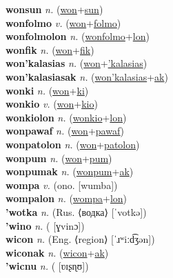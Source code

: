 \textbf{wonsun} \textit{n.} (\hyperref[won]{won}+\hyperref[sun]{sun})
 \label{wonsun} \\
\textbf{wonfolmo} \textit{v.} (\hyperref[won]{won}+\hyperref[folmo]{folmo})
 \label{wonfolmo} \\
\textbf{wonfolmolon} \textit{n.} (\hyperref[wonfolmo]{wonfolmo}+\hyperref[lon]{lon})
 \label{wonfolmolon} \\
\textbf{wonfik} \textit{n.} (\hyperref[won]{won}+\hyperref[fik]{fik})
 \label{wonfik} \\
\textbf{won'kalasias} \textit{n.} (\hyperref[won]{won}+\hyperref['kalasias]{'kalasias})
 \label{won'kalasias} \\
\textbf{won'kalasiasak} \textit{n.} (\hyperref[won'kalasias]{won'kalasias}+\hyperref[ak]{ak})
 \label{won'kalasiasak} \\
\textbf{wonki} \textit{n.} (\hyperref[won]{won}+\hyperref[ki]{ki})
 \label{wonki} \\
\textbf{wonkio} \textit{v.} (\hyperref[won]{won}+\hyperref[kio]{kio})
 \label{wonkio} \\
\textbf{wonkiolon} \textit{n.} (\hyperref[wonkio]{wonkio}+\hyperref[lon]{lon})
 \label{wonkiolon} \\
\textbf{wonpawaf} \textit{n.} (\hyperref[won]{won}+\hyperref[pawaf]{pawaf})
 \label{wonpawaf} \\
\textbf{wonpatolon} \textit{n.} (\hyperref[won]{won}+\hyperref[patolon]{patolon})
 \label{wonpatolon} \\
\textbf{wonpum} \textit{n.} (\hyperref[won]{won}+\hyperref[pum]{pum})
 \label{wonpum} \\
\textbf{wonpumak} \textit{n.} (\hyperref[wonpum]{wonpum}+\hyperref[ak]{ak})
 \label{wonpumak} \\
\textbf{wompa} \textit{v.} (ono. [wumba])
 \label{wompa} \\
\textbf{wompalon} \textit{n.} (\hyperref[wompa]{wompa}+\hyperref[lon]{lon})
 \label{wompalon} \\
\textbf{'wotka} \textit{n.} (Rus. ⟨водка⟩ [ˈvotkə])
 \label{'wotka} \\
\textbf{'wino} \textit{n.} ( [ɣvinɔ])
 \label{'wino} \\
\textbf{wicon} \textit{n.} (Eng. ⟨region⟩ [ˈɹʷiːd͡ʒən])
 \label{wicon} \\
\textbf{wiconak} \textit{n.} (\hyperref[wicon]{wicon}+\hyperref[ak]{ak})
 \label{wiconak} \\
\textbf{'wicnu} \textit{n.} ( [ʋɪʂɳʊ])
 \label{'wicnu} \\
